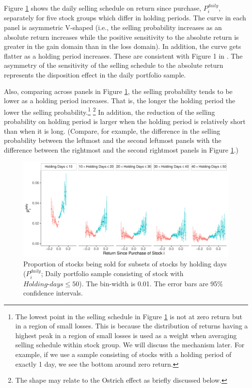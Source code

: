 \documentclass[11pt, a4paper]{article}
\begin{document}
Figure \ref{figure:prop_by_days_less50} shows the daily selling schedule on return since purchase, $P^{daily}_{i}$, separately for five stock groups which differ in holding periods. The curve in each panel is asymmetric V-shaped (i.e., the selling probability increases as an absolute return increases while the positive sensitivity to the absolute return is greater in the gain domain than in the loss domain). In addition, the curve gets flatter as a holding period increases. These are consistent with Figure 1 in \citet{BenDavidHirshleifer12}. The asymmetry of the sensitivity of the selling schedule to the absolute return represents the disposition effect in the daily portfolio sample.

Also, comparing across panels in Figure \ref{figure:prop_by_days_less50}, the selling probability tends to be lower as a holding period increases. That is, the longer the holding period the lower the selling probability.\footnote{The lowest point in the selling schedule in Figure \ref{figure:prop_by_days_less50} is not at zero return but in a region of small losses. This is because the distribution of returns having a highest peak in a region of small losses is used as a weight when averaging selling schedule within stock group. We will discuss the mechanism later. For example, if we use a sample consisting of stocks with a holding period of exactly 1 day, we see the bottom around zero return.} \footnote{The shape may relate to the Ostrich effect as briefly discussed below.} In addition, the reduction of the selling probability on holding period is larger when the holding period is relatively short than when it is long. (Compare, for example, the difference in the selling probability between the leftmost and the second leftmost panels with the difference between the rightmost and the second rightmost panels in Figure \ref{figure:prop_by_days_less50}.)

\begin{figure}[H]
	\centering
	\includegraphics[width=1\columnwidth]{barc_schedule_daily_by_days_less50_3.pdf}
	\caption{\small Proportion of stocks being sold for subsets of stocks by holding days ($P^{daily}_{i}$; Daily portfolio sample consisting of stock with $Holding\mbox{-}days\leq50$). The bin-width is 0.01. The error bars are 95\% confidence intervals.}
	\label{figure:prop_by_days_less50}
\end{figure}
\end{document}
